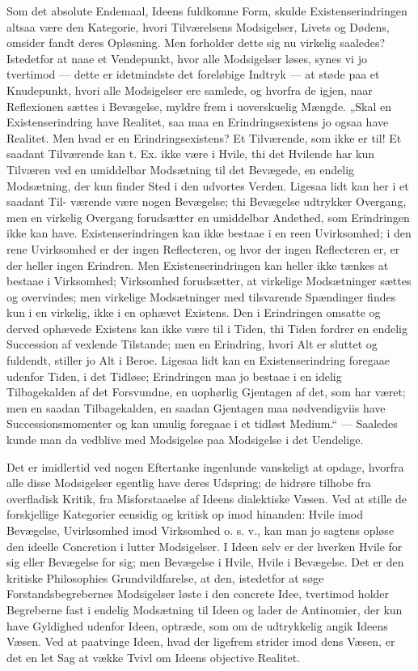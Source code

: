 \documentclass[12pt,a4paper]{book}
\begin{document}
Som det absolute Endemaal, Ideens fuldkomne Form, skulde
Existenserindringen altsaa være den Kategorie, hvori Tilværelsens
Modsigelser, Livets og Dødens, omsider fandt deres Opløsning. Men
forholder dette sig nu virkelig saaledes? Istedetfor at naae et
Vendepunkt, hvor alle Modsigelser løses, synes vi jo tvertimod --- dette
er idetmindste det foreløbige Indtryk --- at støde paa et Knudepunkt,
hvori alle Modsigelser ere samlede, og hvorfra de igjen, naar Reflexionen
sættes i Bevægelse, myldre frem i uoverskuelig Mængde. „Skal en
Existenserindring have Realitet, saa maa en Erindringsexistens jo ogsaa
have Realitet. Men hvad er en Erindringsexistens? Et Tilværende, som
ikke er til! Et saadant Tilværende kan t. Ex. ikke være i Hvile, thi det
Hvilende har kun Tilværen ved en umiddelbar Modsætning til det Bevægede,
en endelig Modsætning, der kun finder Sted i den udvortes Verden.
Ligesaa lidt kan her i et saadant Til-
værende være nogen Bevægelse; thi Bevægelse udtrykker Overgang, men en
virkelig Overgang forudsætter en umiddelbar Andethed, som Erindringen
ikke kan have. Existenserindringen kan ikke bestaae i en reen
Uvirksomhed; i den rene Uvirksomhed er der ingen Reflecteren, og hvor
der ingen Reflecteren er, er der heller ingen Erindren. Men
Existenserindringen kan heller ikke tænkes at bestaae i Virksomhed;
Virksomhed forudsætter, at virkelige Modsætninger sættes og overvindes;
men virkelige Modsætninger med tilsvarende Spændinger findes kun i en
virkelig, ikke i en ophævet Existens. Den i Erindringen omsatte og
derved ophævede Existens kan ikke være til i Tiden, thi Tiden fordrer en
endelig Succession af vexlende Tilstande; men en Erindring, hvori Alt er
sluttet og fuldendt, stiller jo Alt i Beroe. Ligesaa lidt kan en
Existenserindring foregaae udenfor Tiden, i det Tidløse; Erindringen maa
jo bestaae i en idelig Tilbagekalden af det Forsvundne, en uophørlig
Gjentagen af det, som har været; men en saadan Tilbagekalden, en saadan
Gjentagen maa nødvendigviis have Successionsmomenter og kan umulig
foregaae i et tidløst Medium.“ --- Saaledes kunde man da vedblive med
Modsigelse paa Modsigelse i det Uendelige.

Det er imidlertid ved nogen Eftertanke ingenlunde vanskeligt at opdage,
hvorfra alle disse Modsigelser egentlig have deres Udspring; de hidrøre
tilhobe fra overfladisk Kritik, fra Misforstaaelse af Ideens dialektiske
Væsen. Ved at stille de forskjellige Kategorier eensidig og kritisk op
imod hinanden: Hvile imod Bevægelse, Uvirksomhed imod Virksomhed o. s.
v., kan man jo sagtens opløse den ideelle Concretion i lutter
Modsigelser. I Ideen selv er der hverken Hvile for sig eller Bevægelse
for sig; men Bevægelse i Hvile, Hvile i Bevægelse. Det er den kritiske
Philosophies Grundvildfarelse, at den, istedetfor at søge
Forstandsbegrebernes Modsigelser løste i den concrete Idee, tvertimod
holder Begreberne fast i endelig Modsætning til Ideen og lader de
Antinomier, der kun have
Gyldighed udenfor Ideen, optræde, som om de udtrykkelig angik Ideens
Væsen. Ved at paatvinge Ideen, hvad der ligefrem strider imod dens
Væsen, er det en let Sag at vække Tvivl om Ideens objective Realitet.
\end{document}
